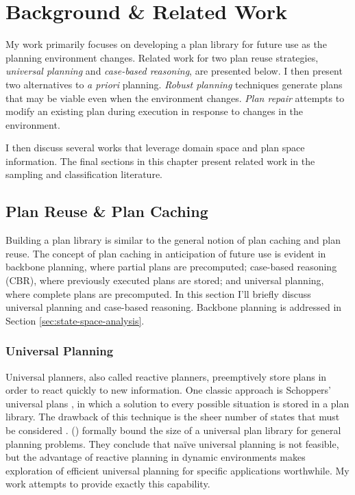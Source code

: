 \chapter{Background \& Related Work}
\thispagestyle{plain}

\label{ch:background}

My work primarily focuses on developing a plan library for future use as the planning environment changes.  Related work for two plan reuse strategies, \textit{universal planning} and \textit{case-based reasoning}, are presented below.  I then present two alternatives to \textit{a priori} planning.  \textit{Robust planning} techniques generate plans that may be viable even when the environment changes.  \textit{Plan repair} attempts to modify an existing plan during execution in response to changes in the environment.

I then discuss several works that leverage domain space and plan space information.  The final sections in this chapter present related work in the sampling and classification literature.

\section{Plan Reuse \& Plan Caching}

Building a plan library is similar to the general notion of plan caching and plan reuse.  The concept of plan caching in anticipation of future use is evident in backbone planning, where partial plans are precomputed; case-based reasoning (CBR), where previously executed plans are stored; and universal planning, where complete plans are precomputed.  In this section I'll briefly discuss universal planning and case-based reasoning.  Backbone planning is addressed in Section \ref{sec:state-space-analysis}.



\subsection{Universal Planning}

Universal planners, also called reactive planners, preemptively store plans in order to react quickly to new information.  One classic approach is Schoppers' universal plans \citep{schoppers87universal,schoppers89defense,schoppers94estimating,chapman89penguins}, in which a solution to every possible situation is stored in a plan library.  The drawback of this technique is the sheer number of states that must be considered \citep{ginsberg89universal,ginsberg89ginsberg,jonsson96size}.  \citeauthor{jonsson96size} (\citeyear{jonsson96size}) formally bound the size of a universal plan library for general planning problems.  They conclude that na\"{i}ve universal planning is not feasible, but the advantage of reactive planning in dynamic environments makes exploration of efficient universal planning for specific applications worthwhile.  My work attempts to provide exactly this capability.


